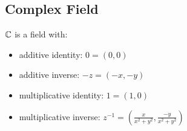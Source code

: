 \documentclass[letterpaper,12pt,fleqn]{article}
\begin{document}
\subsection*{Complex Field}

\begin{theorem}
$\mathbb{C}$ is a field with:
\begin{itemize}
\item additive identity: $0=(0,0)$
\item additive inverse: $-z=(-x,-y)$
\item multiplicative identity: $1=(1,0)$
\item multiplicative inverse:
    $z^{-1}=\left(\frac{x}{x^2+y^2},\frac{-y}{x^2+y^2}\right)$
\end{itemize}
\end{theorem}
\end{document}
